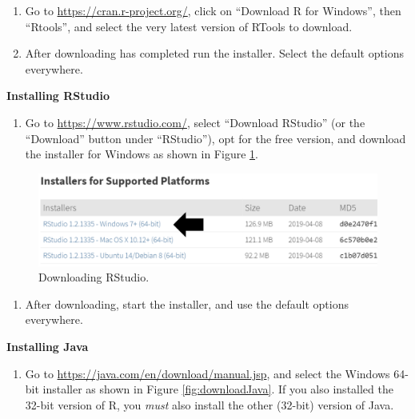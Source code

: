 \documentclass[11pt]{book}
\providecommand{\tightlist}{%
  \setlength{\itemsep}{0pt}\setlength{\parskip}{0pt}}
\theoremstyle{definition}
\theoremstyle{definition}
\theoremstyle{definition}
\theoremstyle{remark}
\begin{document}
\begin{enumerate}
\def\labelenumi{\arabic{enumi}.}
\item
  Go to \url{https://cran.r-project.org/}, click on ``Download R for Windows'', then ``Rtools'', and select the very latest version of RTools to download.
\item
  After downloading has completed run the installer. Select the default options everywhere.
\end{enumerate}

\textbf{Installing RStudio}

\begin{enumerate}
\def\labelenumi{\arabic{enumi}.}
\tightlist
\item
  Go to \url{https://www.rstudio.com/}, select ``Download RStudio'' (or the ``Download'' button under ``RStudio''), opt for the free version, and download the installer for Windows as shown in Figure \ref{fig:downloadRStudio}.
\end{enumerate}

\begin{figure}

{\centering \includegraphics[width=1\linewidth]{images/OhdsiAnalyticsTools/downloadRStudio} 

}

\caption{Downloading RStudio.}\label{fig:downloadRStudio}
\end{figure}

\begin{enumerate}
\def\labelenumi{\arabic{enumi}.}
\setcounter{enumi}{1}
\tightlist
\item
  After downloading, start the installer, and use the default options everywhere.
\end{enumerate}

\textbf{Installing Java}

\begin{enumerate}
\def\labelenumi{\arabic{enumi}.}
\tightlist
\item
  Go to \url{https://java.com/en/download/manual.jsp}, and select the Windows 64-bit installer as shown in Figure \ref{fig:downloadJava}. If you also installed the 32-bit version of R, you \emph{must} also install the other (32-bit) version of Java.
\end{enumerate}
\end{document}
